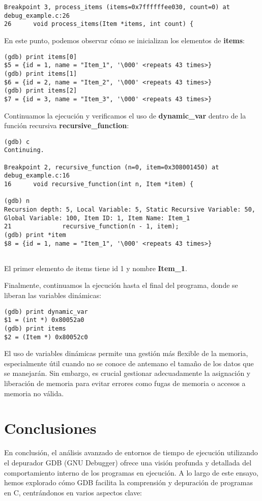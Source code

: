 \documentclass[12pt,a4paper]{article}
\begin{document}
\begin{itemize}
\begin{verbatim}
Breakpoint 3, process_items (items=0x7ffffffee030, count=0) at debug_example.c:26
26      void process_items(Item *items, int count) {	
\end{verbatim}
En este punto, podemos observar cómo se inicializan los elementos de \textbf{items}:
\begin{verbatim}
(gdb) print items[0]
$5 = {id = 1, name = "Item_1", '\000' <repeats 43 times>}
(gdb) print items[1]
$6 = {id = 2, name = "Item_2", '\000' <repeats 43 times>}
(gdb) print items[2]
$7 = {id = 3, name = "Item_3", '\000' <repeats 43 times>}	
\end{verbatim}
Continuamos la ejecución y verificamos el uso de \textbf{dynamic\_var} dentro de la función recursiva \textbf{recursive\_function}:
\begin{verbatim}
(gdb) c
Continuing.

Breakpoint 2, recursive_function (n=0, item=0x308001450) at debug_example.c:16
16      void recursive_function(int n, Item *item) {	

(gdb) n
Recursion depth: 5, Local Variable: 5, Static Recursive Variable: 50, 
Global Variable: 100, Item ID: 1, Item Name: Item_1
21              recursive_function(n - 1, item);
(gdb) print *item
$8 = {id = 1, name = "Item_1", '\000' <repeats 43 times>}
	
\end{verbatim}
El primer elemento de items tiene id 1 y nombre \textbf{Item\_1}. 

Finalmente, continuamos la ejecución hasta el final del programa, donde se liberan las variables dinámicas:
\begin{verbatim}
(gdb) print dynamic_var
$1 = (int *) 0x80052a0
(gdb) print items
$2 = (Item *) 0x80052c0	
\end{verbatim}
El uso de variables dinámicas permite una gestión más flexible de la memoria, especialmente útil cuando no se conoce de antemano el tamaño de los datos que se manejarán. Sin embargo, es crucial gestionar adecuadamente la asignación y liberación de memoria para evitar errores como fugas de memoria o accesos a memoria no válida.
\end{itemize}

\newpage
\section{Conclusiones}
En conclusión, el análisis avanzado de entornos de tiempo de ejecución utilizando el depurador GDB (GNU Debugger) ofrece una visión profunda y detallada del comportamiento interno de los programas en ejecución. A lo largo de este ensayo, hemos explorado cómo GDB facilita la comprensión y depuración de programas en C, centrándonos en varios aspectos clave:
\end{document}
